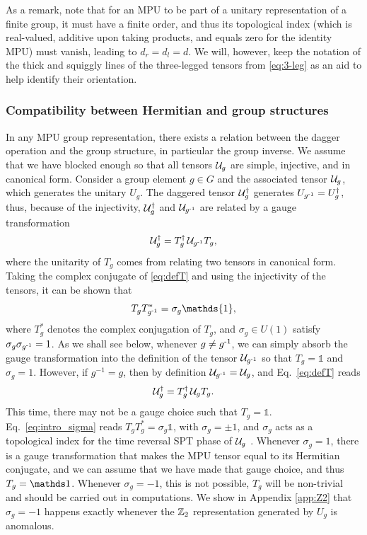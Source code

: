 \documentclass[reprint,
superscriptaddress,
amsmath,amssymb,
notitlepage,
aps,
prb,
10pt, 
tightenlines
]{revtex4-2}
\begin{document}
As a remark, note that for an MPU to be part of a unitary representation of a finite group, it must have a finite order, and thus its topological index (which is real-valued, additive upon taking products, and equals zero for the identity MPU) must vanish, leading to $d_r=d_l=d$. We will, however, keep the notation of the thick and squiggly lines of the three-legged tensors from \eqref{eq:3-leg} as an aid to help identify their orientation.

\subsubsection{Compatibility between Hermitian and group structures}
\label{sec:daggerinverse}

In any MPU group representation, there exists a relation between the dagger operation and the group structure, in particular the group inverse. We assume that we have blocked enough so that all tensors $\mathcal{U}_g$ are simple, injective, and in canonical form. Consider a group element $g\in G$ and the associated tensor $\mathcal{U}_g$, which generates the unitary $U_g$. The daggered tensor $\mathcal{U}_g^\dagger$ generates $U_{g^{\text{-}1}} = U_g^\dagger$, thus, because of the injectivity, $\mathcal{U}^\dagger_g$ and $\mathcal{U}_{g^{\text{-}1}}$ are related by a gauge transformation
\begin{equation}
    \mathcal{U}_g^\dagger = T_g^\dagger\,\mathcal{U}_{g^{\text{-}1}} T_g,
    \label{eq:defT}
\end{equation}
where the unitarity of $T_g$ comes from relating two tensors in canonical form. Taking the complex conjugate of \eqref{eq:defT} and using the injectivity of the tensors, it can be shown that
\begin{equation}
    T_gT^*_{\inv g}=\sigma_g\mathds{1},
    \label{eq:intro_sigma}
\end{equation}
where $T_g^\ast$ denotes the complex conjugation of $T_g$, and $\sigma_g\in U(1)$ satisfy $\sigma_g\sigma_{g^{\text{-}1}}=1$.
As we shall see below, whenever $g\neq g^{\text{-}1}$, we can simply absorb the gauge transformation into the definition of the tensor $\mathcal{U}_{g^{\text{-}1}}$ so that $T_g=\mathds{1}$ and $\sigma_g=1$. However, if $g^{-1}=g$, then by definition $\mathcal{U}_{g^{\text{-}1}} = \mathcal{U}_g$, and Eq.~\eqref{eq:defT} reads
\begin{equation}
    \mathcal{U}_{g}^\dagger = T_g^{\dagger}\,\mathcal{U}_g T_g.
\end{equation}
This time, there may not be a gauge choice such that $T_g=\mathds{1}$. Eq.~\eqref{eq:intro_sigma} reads $T^{\phantom{*}}_gT_g^*=\sigma_g \mathds{1}$, with $\sigma_g=\pm 1$, and $\sigma_g$ acts as a topological index for the time reversal SPT phase of $\mathcal{U}_g$ \cite[Section~III.A.1]{Review}. Whenever $\sigma_g=1$, there is a gauge transformation that makes the MPU tensor equal to its Hermitian conjugate, and we can assume that we have made that gauge choice, and thus $T_g=\I$. Whenever $\sigma_g = -1$, this is not possible, $T_g$ will be non-trivial and should be carried out in computations. We show in Appendix \ref{app:Z2} that $\sigma_g=-1$ happens exactly whenever the $\mathbb{Z}_2$ representation generated by $U_g$ is anomalous.
\end{document}
